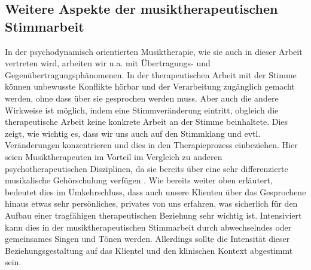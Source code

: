 \subsection{Weitere Aspekte der musiktherapeutischen Stimmarbeit}
In der psychodynamisch orientierten Musiktherapie, wie sie auch in dieser Arbeit vertreten wird, arbeiten wir u.a. mit Übertragungs- und Gegenübertragungsphänomenen. In der therapeutischen Arbeit mit der Stimme können unbewusste Konflikte hörbar und der Verarbeitung zugänglich gemacht werden, ohne dass über sie gesprochen werden muss. Aber auch die andere Wirkweise ist möglich, indem eine Stimmveränderung eintritt, obgleich die therapeutische Arbeit keine konkrete Arbeit an der Stimme beinhaltete. Dies zeigt, wie wichtig es, dass wir uns auch auf den Stimmklang und evtl. Veränderungen konzentrieren und dies in den Therapieprozess einbeziehen. Hier seien Musiktherapeuten im Vorteil im Vergleich zu anderen psychotherapeutischen Disziplinen, da sie bereits über eine sehr differenzierte musikalische Gehörschulung verfügen \autocite[vgl.][212]{rittner2008}. Wie bereits weiter oben erläutert, bedeutet dies im Umkehrschluss, dass auch unsere Klienten über das Gesprochene hinaus etwas sehr persönliches, privates von uns erfahren, was sicherlich für den Aufbau einer tragfähigen therapeutischen Beziehung sehr wichtig ist. Intensiviert kann dies in der musiktherapeutischen Stimmarbeit durch abwechselndes oder gemeinsames Singen und Tönen werden. Allerdings sollte die Intensität dieser Beziehungsgestaltung auf das Klientel und den klinischen Kontext abgestimmt sein.

